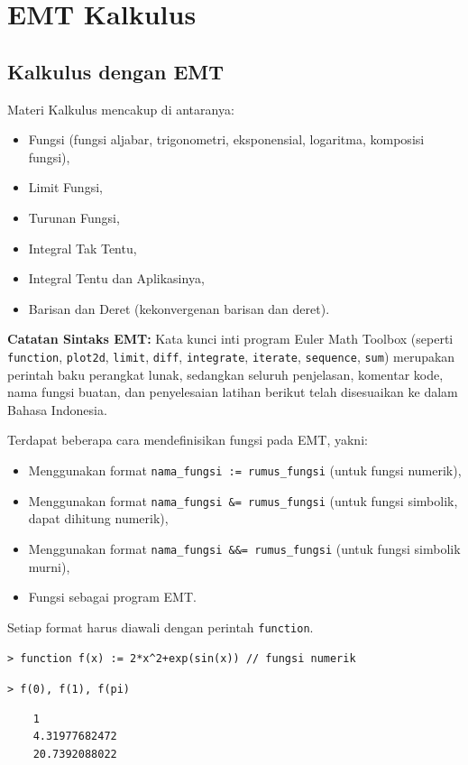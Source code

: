 \documentclass[11pt, a4paper]{article}
\newcommand{\emtcmd}[1]{\noindent\texttt{\textcolor{emtcommand}{>}\ #1}\par\smallskip}
\begin{document}
\section*{EMT Kalkulus}

\subsection*{Kalkulus dengan EMT}

Materi Kalkulus mencakup di antaranya:
\begin{itemize}
    \item Fungsi (fungsi aljabar, trigonometri, eksponensial, logaritma, komposisi fungsi),
    \item Limit Fungsi,
    \item Turunan Fungsi,
    \item Integral Tak Tentu,
    \item Integral Tentu dan Aplikasinya,
    \item Barisan dan Deret (kekonvergenan barisan dan deret).
\end{itemize}

\textbf{Catatan Sintaks EMT:} Kata kunci inti program Euler Math Toolbox (seperti \texttt{function}, \texttt{plot2d}, \texttt{limit}, \texttt{diff}, \texttt{integrate}, \texttt{iterate}, \texttt{sequence}, \texttt{sum}) merupakan perintah baku perangkat lunak, sedangkan seluruh penjelasan, komentar kode, nama fungsi buatan, dan penyelesaian latihan berikut telah disesuaikan ke dalam Bahasa Indonesia.

Terdapat beberapa cara mendefinisikan fungsi pada EMT, yakni:
\begin{itemize}
    \item Menggunakan format \texttt{nama\_fungsi := rumus\_fungsi} (untuk fungsi numerik),
    \item Menggunakan format \texttt{nama\_fungsi \&= rumus\_fungsi} (untuk fungsi simbolik, dapat dihitung numerik),
    \item Menggunakan format \texttt{nama\_fungsi \&\&= rumus\_fungsi} (untuk fungsi simbolik murni),
    \item Fungsi sebagai program EMT.
\end{itemize}
Setiap format harus diawali dengan perintah \texttt{function}.

\emtcmd{function f(x) := 2*x\^{}2+exp(sin(x)) \textcolor{emtcomment}{// fungsi numerik}}
\emtcmd{f(0), f(1), f(pi)}
\begin{verbatim}
    1
    4.31977682472
    20.7392088022
\end{verbatim}
\end{document}
